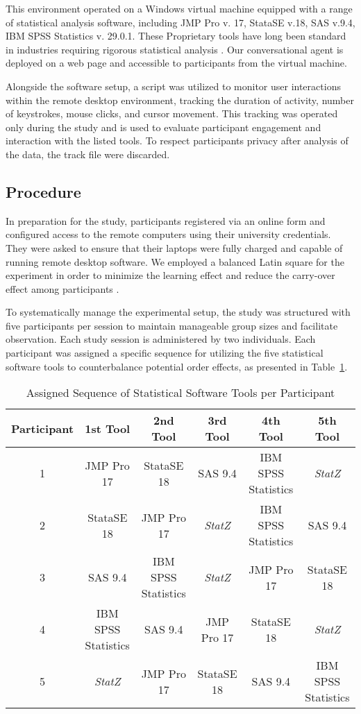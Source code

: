 \documentclass{article}
\begin{document}
This environment operated on a Windows virtual machine equipped with a range of statistical analysis software, including JMP Pro v. 17, StataSE v.18, SAS v.9.4, IBM SPSS Statistics v. 29.0.1. These Proprietary tools have long been standard in industries requiring rigorous statistical analysis \cite{Raykov2006}. Our conversational agent is deployed on a web page and accessible to participants from the virtual machine. 

Alongside the software setup, a script was utilized to monitor user interactions within the remote desktop environment, tracking the duration of activity, number of keystrokes, mouse clicks, and cursor movement. This tracking was operated only during the study and is used to evaluate participant engagement and interaction with the listed tools. To respect participants privacy after analysis of the data, the track file were discarded.

\subsection{Procedure}

In preparation for the study, participants registered via an online form and configured access to the remote computers using their university credentials. They were asked to ensure that their laptops were fully charged and capable of running remote desktop software.
We employed a balanced Latin square \cite{Mandal2017} for the experiment in order to minimize the learning effect and reduce the carry-over effect among participants \cite{Brooks2012}.

To systematically manage the experimental setup, the study was structured with five participants per session to maintain manageable group sizes and facilitate observation. Each study session is administered by two individuals. Each participant was assigned a specific sequence for utilizing the five statistical software tools to counterbalance potential order effects, as presented in Table~\ref{tab:software_sequence}.

\begin{table}[h]
    \centering
    \caption{Assigned Sequence of Statistical Software Tools per Participant}
    \label{tab:software_sequence}
    \begin{tabular}{|c|c|c|c|c|c|}
    \hline
    \textbf{Participant} & \textbf{1st Tool} & \textbf{2nd Tool} & \textbf{3rd Tool} & \textbf{4th Tool} & \textbf{5th Tool} \\ \hline
    1 & JMP Pro 17 & StataSE 18 & SAS 9.4 & IBM SPSS Statistics & \textit{StatZ} \\ \hline
    2 & StataSE 18 & JMP Pro 17 & \textit{StatZ} & IBM SPSS Statistics & SAS 9.4 \\ \hline
    3 & SAS 9.4 & IBM SPSS Statistics & \textit{StatZ} & JMP Pro 17 & StataSE 18 \\ \hline
    4 & IBM SPSS Statistics & SAS 9.4 & JMP Pro 17 & StataSE 18 & \textit{StatZ} \\ \hline
    5 & \textit{StatZ} & JMP Pro 17 & StataSE 18 & SAS 9.4 & IBM SPSS Statistics \\ \hline
    \end{tabular}
\end{table}
\end{document}
